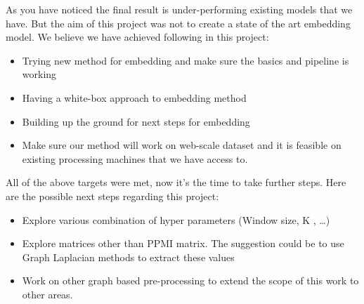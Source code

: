 As you have noticed the final result is under-performing existing models that we have. But the aim of this project was not to create a state of the art embedding model. We believe we have achieved following in this project: 

\begin{itemize}
    \item Trying new method for embedding and make sure the basics and pipeline is working 
    \item Having a white-box approach to embedding method 
    \item Building up the ground for next steps for embedding
    \item Make sure our method will work on web-scale dataset and it is feasible on existing processing machines that we have access to. 
\end{itemize}

All of the above targets were met, now it's the time to take further steps. Here are the possible next steps regarding this project: 

\begin{itemize}
    \item Explore various combination of hyper parameters (Window size, K , \ldots)
    \item Explore matrices other than PPMI matrix. The suggestion could be to use  Graph Laplacian methods to extract these values
    \item Work on other graph based pre-processing to extend the scope of this work to other areas. 
\end{itemize}

